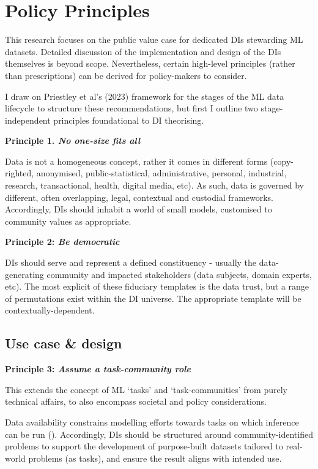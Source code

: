 \chapter{Policy Principles}

This research focuses on the public value case for dedicated DIs stewarding ML datasets. Detailed discussion of the implementation and design of the DIs themselves is beyond scope. Nevertheless, certain high-level principles (rather than prescriptions) can be derived for policy-makers to consider.

I draw on Priestley et al's (2023) framework for the stages of the ML data lifecycle to structure these recommendations, but first I outline two stage-independent principles foundational to DI theorising. 

\textbf{Principle 1. \textit{No one-size fits all}}

Data is not a homogeneous concept, rather it comes in different forms (copy-righted, anonymised, public-statistical, administrative, personal, industrial, research, transactional, health, digital media, etc). As such, data is governed by different, often overlapping, legal, contextual and custodial frameworks. Accordingly, DIs should inhabit a world of small models, customised to community values as appropriate. 

\textbf{Principle 2: \textit{Be democratic}}

DIs should serve and represent a defined constituency - usually the data-generating community and impacted stakeholders (data subjects, domain experts, etc). The most explicit of these fiduciary templates is the data trust, but a range of permutations exist within the DI universe. The appropriate template will be contextually-dependent.

\section*{Use case \& design} 

\textbf{Principle 3: \textit{Assume a task-community role}}

This extends the concept of ML `tasks' and `task-communities' from purely technical affairs, to also encompass societal and policy considerations. 

Data availability constrains modelling efforts towards tasks on which inference can be run (\cite{leavy2020DataPowerBias}). Accordingly, DIs should be structured around community-identified problems to support the development of purpose-built datasets tailored to real-world problems (as tasks), and ensure the result aligns with intended use. 

